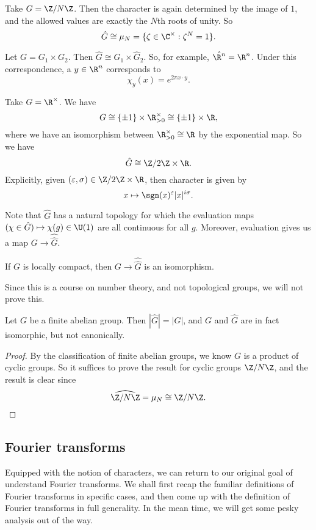 \documentclass[a4paper]{article}
\begin{document}
\begin{eg}
  Take $G = \Z/N\Z$. Then the character is again determined by the image of $1$, and the allowed values are exactly the $N$th roots of unity. So
  \[
    \hat{G} \cong \mu_N = \{\zeta \in \C^\times: \zeta^N = 1\}.
  \]
\end{eg}

\begin{eg}
  Let $G = G_1 \times G_2$. Then $\hat{G} \cong \hat{G}_1 \times \hat{G}_2$. So, for example, $\hat{\R^n} = \R^n$. Under this correspondence, a $y \in \R^n$ corresponds to
  \[
    \chi_y(x) = e^{2\pi x\cdot y}.
  \]
\end{eg}

\begin{eg}
  Take $G = \R^\times$. We have
  \[
    G \cong \{\pm 1\} \times \R^\times_{>0} \cong \{\pm 1\} \times \R,
  \]
  where we have an isomorphism between $\R^{\times}_{> 0} \cong \R$ by the exponential map. So we have
  \[
    \hat{G} \cong \Z/2\Z \times \R.
  \]
  Explicitly, given $(\varepsilon, \sigma) \in \Z/2\Z \times \R$, then character is given by
  \[
    x \mapsto \sgn(x)^\varepsilon |x|^{i\sigma}.
  \]
\end{eg}

Note that $\hat{G}$ has a natural topology for which the evaluation maps $(\chi \in \hat{G}) \mapsto \chi(g) \in \U(1)$ are all continuous for all $g$. Moreover, evaluation gives us a map $G \to \hat{\hat{G}}$.

\begin{thm}
  If $G$ is locally compact, then $G \to \hat{\hat{G}}$ is an isomorphism.
\end{thm}
Since this is a course on number theory, and not topological groups, we will not prove this.

\begin{prop}
  Let $G$ be a finite abelian group. Then $|\hat{G}| = |G|$, and $G$ and $\hat{G}$ are in fact isomorphic, but not canonically.
\end{prop}

\begin{proof}
  By the classification of finite abelian groups, we know $G$ is a product of cyclic groups. So it suffices to prove the result for cyclic groups $\Z/N\Z$, and the result is clear since
  \[
    \widehat{\Z/N\Z} = \mu_N \cong \Z/N\Z.
  \]
\end{proof}

\subsection{Fourier transforms}
Equipped with the notion of characters, we can return to our original goal of understand Fourier transforms. We shall first recap the familiar definitions of Fourier transforms in specific cases, and then come up with the definition of Fourier transforms in full generality. In the mean time, we will get some pesky analysis out of the way.
\end{document}
